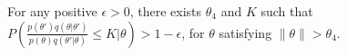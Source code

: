 

\begin{assumption}
For any positive $\epsilon > 0$, there exists $\theta_4$ and $K$
such that $P(\frac{p(\theta')q(\theta|\theta')}{p(\theta)q(\theta'|\theta)} \le K | \theta) > 1 - \epsilon$,
for $\theta$ satisfying $\parallel \theta \parallel  > \theta_4$.
  \label{asmp:prior}
\end{assumption}



